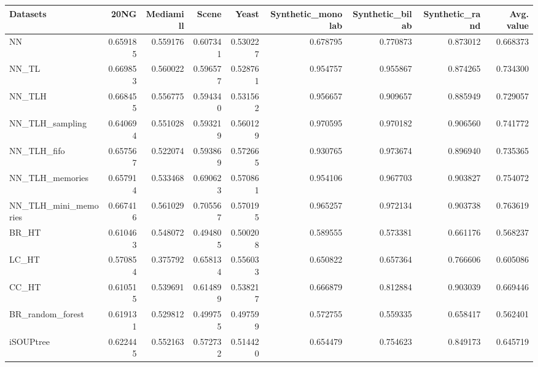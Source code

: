 \begin{tabular}{lrrrrrrrr}
\toprule
Datasets &      20NG &  Mediamill &     Scene &     Yeast &  Synthetic\_monolab &  Synthetic\_bilab &  Synthetic\_rand &  Avg. value \\
\midrule
NN                   &  0.659185 &   0.559176 &  0.607341 &  0.530227 &           0.678795 &         0.770873 &        0.873012 &    0.668373 \\
NN\_TL                &  0.669853 &   0.560022 &  0.596577 &  0.528761 &           0.954757 &         0.955867 &        0.874265 &    0.734300 \\
NN\_TLH               &  0.668455 &   0.556775 &  0.594340 &  0.531562 &           0.956657 &         0.909657 &        0.885949 &    0.729057 \\
NN\_TLH\_sampling      &  0.640694 &   0.551028 &  0.593219 &  0.560129 &           0.970595 &         0.970182 &        0.906560 &    0.741772 \\
NN\_TLH\_fifo          &  0.657567 &   0.522074 &  0.593869 &  0.572665 &           0.930765 &         0.973674 &        0.896940 &    0.735365 \\
NN\_TLH\_memories      &  0.657914 &   0.533468 &  0.690623 &  0.570861 &           0.954106 &         0.967703 &        0.903827 &    0.754072 \\
NN\_TLH\_mini\_memories &  0.667416 &   0.561029 &  0.705567 &  0.570195 &           0.965257 &         0.972134 &        0.903738 &    0.763619 \\
BR\_HT                &  0.610463 &   0.548072 &  0.494805 &  0.500208 &           0.589555 &         0.573381 &        0.661176 &    0.568237 \\
LC\_HT                &  0.570854 &   0.375792 &  0.658134 &  0.556033 &           0.650822 &         0.657364 &        0.766606 &    0.605086 \\
CC\_HT                &  0.610515 &   0.539691 &  0.614899 &  0.538217 &           0.666879 &         0.812884 &        0.903039 &    0.669446 \\
BR\_random\_forest     &  0.619131 &   0.529812 &  0.499755 &  0.497599 &           0.572755 &         0.559335 &        0.658417 &    0.562401 \\
iSOUPtree            &  0.622445 &   0.552163 &  0.572732 &  0.514420 &           0.654479 &         0.754623 &        0.849173 &    0.645719 \\
\bottomrule
\end{tabular}
